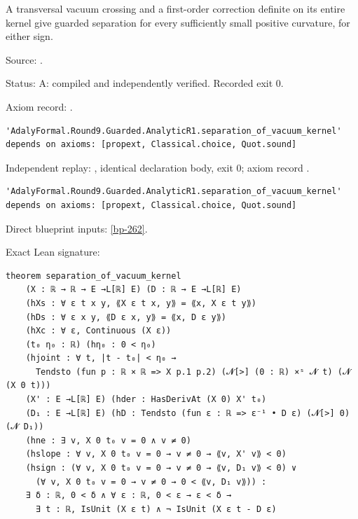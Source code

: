 \begin{theorem}[bp-085]
\label{bp-085}
\leanok
A transversal vacuum crossing and a first-order correction definite on its entire kernel give guarded separation for every sufficiently small positive curvature, for either sign.

\par Source: \texttt{}.
\par Status: A: compiled and independently verified. Recorded exit 0.
\par Axiom record: \texttt{}.
\begin{verbatim}
'AdalyFormal.Round9.Guarded.AnalyticR1.separation_of_vacuum_kernel' depends on axioms: [propext, Classical.choice, Quot.sound]
\end{verbatim}
\par Independent replay: \texttt{}, identical declaration body, exit 0; axiom record \texttt{}.
\begin{verbatim}
'AdalyFormal.Round9.Guarded.AnalyticR1.separation_of_vacuum_kernel' depends on axioms: [propext, Classical.choice, Quot.sound]
\end{verbatim}
\par Direct blueprint inputs: \ref{bp-262}.
\par Exact Lean signature:
\begin{verbatim}
theorem separation_of_vacuum_kernel
    (X : ℝ → ℝ → E →L[ℝ] E) (D : ℝ → E →L[ℝ] E)
    (hXs : ∀ ε t x y, ⟪X ε t x, y⟫ = ⟪x, X ε t y⟫)
    (hDs : ∀ ε x y, ⟪D ε x, y⟫ = ⟪x, D ε y⟫)
    (hXc : ∀ ε, Continuous (X ε))
    (t₀ η₀ : ℝ) (hη₀ : 0 < η₀)
    (hjoint : ∀ t, |t - t₀| < η₀ →
      Tendsto (fun p : ℝ × ℝ => X p.1 p.2) (𝓝[>] (0 : ℝ) ×ˢ 𝓝 t) (𝓝 (X 0 t)))
    (X' : E →L[ℝ] E) (hder : HasDerivAt (X 0) X' t₀)
    (D₁ : E →L[ℝ] E) (hD : Tendsto (fun ε : ℝ => ε⁻¹ • D ε) (𝓝[>] 0) (𝓝 D₁))
    (hne : ∃ v, X 0 t₀ v = 0 ∧ v ≠ 0)
    (hslope : ∀ v, X 0 t₀ v = 0 → v ≠ 0 → ⟪v, X' v⟫ < 0)
    (hsign : (∀ v, X 0 t₀ v = 0 → v ≠ 0 → ⟪v, D₁ v⟫ < 0) ∨
      (∀ v, X 0 t₀ v = 0 → v ≠ 0 → 0 < ⟪v, D₁ v⟫)) :
    ∃ δ : ℝ, 0 < δ ∧ ∀ ε : ℝ, 0 < ε → ε < δ →
      ∃ t : ℝ, IsUnit (X ε t) ∧ ¬ IsUnit (X ε t - D ε)
\end{verbatim}
\end{theorem}

